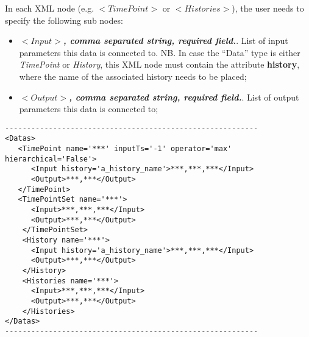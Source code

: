 \vspace{-5mm}
In each XML node (e.g. $<TimePoint>$ or $<Histories>$), the user needs to specify the following sub nodes:
\begin{itemize}
 \item $<Input>$\textbf{\textit{, comma separated string, required field.}}.  List of input parameters this data is connected to. NB. In case the ``Data'' type is either \textit{TimePoint} or  \textit{History}, this XML node must contain the attribute \textbf{history}, where the name of the associated history needs to be placed;
 \item $<Output>$\textbf{\textit{, comma separated string, required field.}}.  List of output parameters this data is connected to;
\end{itemize}

\begin{lstlisting}[style=XML]
----------------------------------------------------------
<Datas> 
   <TimePoint name='***' inputTs='-1' operator='max' hierarchical='False'>  
      <Input history='a_history_name'>***,***,***</Input>
      <Output>***,***</Output>
   </TimePoint> 
   <TimePointSet name='***'>  
      <Input>***,***,***</Input>
      <Output>***,***</Output>
    </TimePointSet> 
    <History name='***'>  
      <Input history='a_history_name'>***,***,***</Input>
      <Output>***,***</Output>
    </History> 
    <Histories name='***'>  
      <Input>***,***,***</Input>
      <Output>***,***</Output>
    </Histories> 
</Datas>
----------------------------------------------------------
\end{lstlisting}

